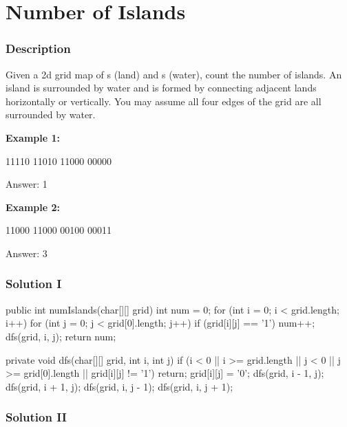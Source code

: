 \newpage

\section{Number of Islands} %

\subsubsection{Description}
Given a 2d grid map of s (land) and s (water), count the number of islands. An island is surrounded by water and is formed by connecting adjacent lands horizontally or vertically. You may assume all four edges of the grid are all surrounded by water.

\textbf{Example 1:}
\begin{Code}
11110
11010
11000
00000
\end{Code}

Answer: 1

\textbf{Example 2:}
\begin{Code}
11000
11000
00100
00011
\end{Code}

Answer: 3

\subsubsection{Solution I}

\begin{Code}
public int numIslands(char[][] grid) {
    int num = 0;
    for (int i = 0; i < grid.length; i++) {
        for (int j = 0; j < grid[0].length; j++) {
            if (grid[i][j] == '1') {
                num++;
                dfs(grid, i, j);
            }
        }
    }
    return num;
}

private void dfs(char[][] grid, int i, int j) {
    if (i < 0 || i >= grid.length || j < 0 || j >= grid[0].length || grid[i][j] != '1') {
        return;
    }
    grid[i][j] = '0';
    dfs(grid, i - 1, j);
    dfs(grid, i + 1, j);
    dfs(grid, i, j - 1);
    dfs(grid, i, j + 1);
}
\end{Code}

\newpage

\subsubsection{Solution II}


